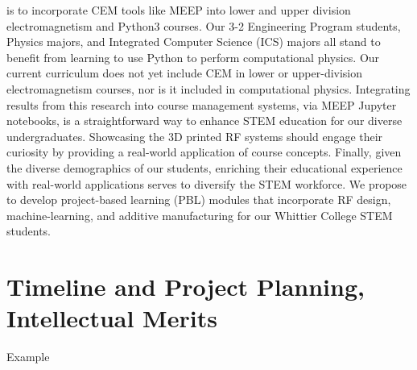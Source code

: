 \documentclass[../../main.tex]{subfiles}
\begin{document}
is to incorporate CEM tools like MEEP into lower and upper division electromagnetism and Python3 courses.  Our 3-2 Engineering Program students, Physics majors, and Integrated Computer Science (ICS) majors all stand to benefit from learning to use Python to perform computational physics.  Our current curriculum does not yet include CEM in lower or upper-division electromagnetism courses, nor is it included in computational physics.  Integrating results from this research into course management systems, via MEEP Jupyter notebooks, is a straightforward way to enhance STEM education for our diverse undergraduates.  Showcasing the 3D printed RF systems should engage their curiosity by providing a real-world application of course concepts.  Finally, given the diverse demographics of our students, enriching their educational experience with real-world applications serves to diversify the STEM workforce.  We propose to develop project-based learning (PBL) modules that incorporate RF design, machine-learning, and additive manufacturing for our Whittier College STEM students.  \\ \vspace{2.5mm}

\section{Timeline and Project Planning, Intellectual Merits}
\label{sec:time_im}

Example
\end{document}
